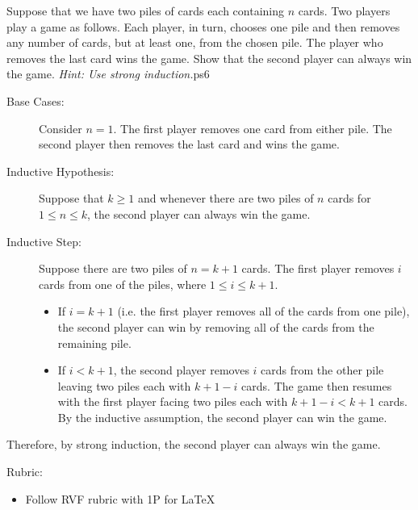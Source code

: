 \documentclass{article}
\theoremstyle{definition}
\begin{document}
\begin{question}
    Suppose that we have two piles of cards each containing $n$ cards. Two players play a game as follows. Each player, in turn, chooses one pile and then removes any number of cards, but at least one, from the chosen pile. The player who removes the last card wins the game. Show that the second player can always win the game. 
    \textit{Hint: Use strong induction.}ps6
\end{question}
\begin{solution}
	\begin{description}
	\item[Base Cases: ] Consider $n=1$. The first player removes one card from either pile. The second player then removes the last card and wins the game.
	
	\item[Inductive Hypothesis: ] Suppose that $k\geq 1$ and whenever there are two piles of $n$ cards for $1\leq n\leq k$, the second player can always win the game.
	
	\item[Inductive Step: ] Suppose there are two piles of $n=k+1$ cards. The first player removes $i$ cards from one of the piles, where $1\leq i\leq k+1$. 
	\begin{itemize}
	\item If $i=k+1$ (i.e. the first player removes all of the cards from one pile), the second player can win by removing all of the cards from the remaining pile. 
	\item If $i<k+1$, the second player removes $i$ cards from the other pile leaving two piles each with $k+1-i$ cards. The game then resumes with the first player facing two piles each with $k+1-i<k+1$ cards. By the inductive assumption, the second player can win the game.
	\end{itemize}
	\end{description}
	Therefore, by strong induction, the second player can always win the game.
	
{\color{red} Rubric:
\begin{itemize}
\item Follow RVF rubric with 1P for \LaTeX
\end{itemize}}
\end{solution}
\end{document}
